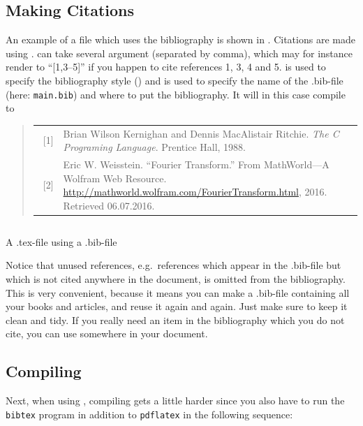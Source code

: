 {\subsection{Making Citations}\label{sec:latex:citations}
An example of a file which uses the bibliography is shown in . Citations are made using \latexin{\cite}. \latexin{\cite} can take several argument (separated by comma), which may for instance render to ``[1,3--5]'' if you happen to cite references 1, 3, 4 and 5. \latexin{} is used to specify the bibliography style () and \latexin{} is used to specify the name of the .bib-file (here: \verb|main.bib|) and where to put the bibliography. It will in this case compile to

\begin{quote}
	\begin{tabular}{l p{}}
		~[1] & Brian Wilson Kernighan and Dennis MacAlistair Ritchie. \textit{The C Programing Language}. Prentice Hall, 1988. \\ 
		~[2] & Eric W. Weisstein. ``Fourier Transform.'' From MathWorld---A Wolfram Web Resource. \url{http://mathworld.wolfram.com/FourierTransform.html}, 2016. Retrieved 06.07.2016.
	\end{tabular}
\end{quote}

\begin{listing}
	\inputminted[frame=lines,linenos]{latex}{latex/bibtex.tex}
	\caption{A .tex-file using a .bib-file}
	\label{lst:latex:bibtex2}
\end{listing}

Notice that unused references, e.g.\ references which appear in the .bib-file but which is not cited anywhere in the document, is omitted from the bibliography. This is very convenient, because it means you can make a .bib-file containing all your books and articles, and reuse it again and again. Just make sure to keep it clean and tidy. If you really need an item in the bibliography which you do not cite, you can use \latexin{\nocite} somewhere in your document.



\subsection{Compiling}
Next, when using \bibtex{}, compiling gets a little harder since you also have to run the \verb|bibtex| program in addition to \verb|pdflatex| in the following sequence:

}
